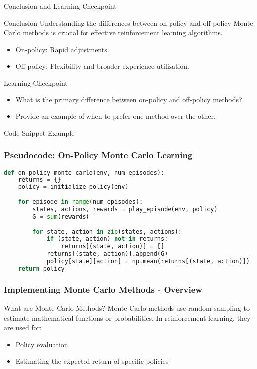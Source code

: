 \documentclass[aspectratio=169]{beamer}
\begin{document}
\begin{frame}{Conclusion and Learning Checkpoint}
    \begin{block}{Conclusion}
        Understanding the differences between on-policy and off-policy Monte Carlo methods is crucial for effective reinforcement learning algorithms.
    \end{block}
    
    \begin{itemize}
        \item On-policy: Rapid adjustments.
        \item Off-policy: Flexibility and broader experience utilization.
    \end{itemize}

    \begin{block}{Learning Checkpoint}
        \begin{itemize}
            \item What is the primary difference between on-policy and off-policy methods?
            \item Provide an example of when to prefer one method over the other.
        \end{itemize}
    \end{block}
\end{frame}

\begin{frame}[fragile]{Code Snippet Example}
    \frametitle{Pseudocode: On-Policy Monte Carlo Learning}
    \begin{lstlisting}[language=Python]
def on_policy_monte_carlo(env, num_episodes):
    returns = {}
    policy = initialize_policy(env)
    
    for episode in range(num_episodes):
        states, actions, rewards = play_episode(env, policy)
        G = sum(rewards)
        
        for state, action in zip(states, actions):
            if (state, action) not in returns:
                returns[(state, action)] = []
            returns[(state, action)].append(G)
            policy[state][action] = np.mean(returns[(state, action)])
    return policy
    \end{lstlisting}
\end{frame}

\begin{frame}[fragile]
    \frametitle{Implementing Monte Carlo Methods - Overview}
    \begin{block}{What are Monte Carlo Methods?}
        Monte Carlo methods use random sampling to estimate mathematical functions or probabilities. In reinforcement learning, they are used for:
        \begin{itemize}
            \item Policy evaluation
            \item Estimating the expected return of specific policies
        \end{itemize}
    \end{block}
\end{frame}
\end{document}
